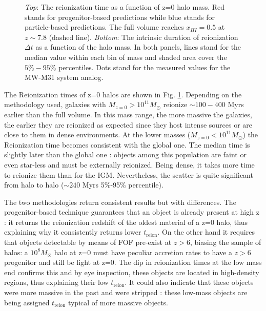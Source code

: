 \documentclass[twocolumn]{aastex61}
\begin{document}
\begin{figure}[ht]
\caption{\textit{Top}: The reionization time as a function of z=0 halo mass.
Red stands for progenitor-based predictions while blue stands for particle-based predictions. The full volume reaches $x_{HI}=0.5$ at $z\sim 7.8$ (dashed line). %
 \textit{Bottom}: The intrinsic duration of reionization  $\Delta t$ as a function of the halo mass. In both panels, lines stand for the median value within each bin of mass and  shaded area cover the $5\%-95\%$ percentiles. Dots stand for the measured values for the MW-M31 system analog.}
\label{fig:treion}
\end{figure}

The Reionization times of z=0 halos are shown in Fig. \ref{fig:treion}. Depending on the methodology used, galaxies with $M_{z=0}>10^{11} M_\odot$ reionize $\sim 100-400$ Myrs earlier than the full volume. In this mass range, the more massive the galaxies, the earlier they are reionized as expected since they host intense sources or are close to them in dense environments. At the lower masses ($M_{z=0}<10^{11} M_\odot$) the Reionization time becomes consistent with the global one.  The median time is slightly later than the global one : objects among this population are faint or even star-less and must be externally reionized. Being dense, it takes more time to reionize them than for the IGM.  Nevertheless, the scatter is quite significant from halo to halo ($\sim 240$ Myrs 5\%-95\% percentile).

The two methodologies return consistent results but with differences. The progenitor-based technique guarantees that an object is already present at high z : it returns the reionization redshift of the oldest material of a z=0 halo, thus explaining why it consistently returns lower $t_\mathrm{reion}$. On the other hand it requires that objects detectable by means of FOF pre-exist at $z>6$, biasing the sample of halos:  a $10^8 M_\odot$ halo at z=0  must have peculiar accretion rates to have a $z>6$ progenitor and still be light at z=0. The dip in reionization times at the low mass end confirms this and  by eye inspection, these objects are located in high-density regions, thus explaining their low $t_\mathrm{reion}$. It could also indicate that these objects were more massive in the past and were stripped : these low-mass objects are being assigned $t_\mathrm{reion}$ typical of more massive objects.
\end{document}
